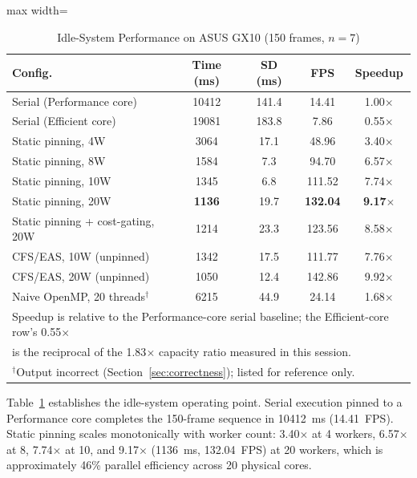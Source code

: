 \documentclass[conference]{IEEEtran}
\begin{document}
\begin{table}[htbp]
\caption{Idle-System Performance on ASUS GX10 (150 frames, $n=7$)}
\begin{center}
\small
\begin{adjustbox}{max width=\columnwidth}
\begin{tabular}{|l|c|c|c|c|}
\hline
\textbf{Config.} & \textbf{Time (ms)} & \textbf{SD (ms)} & \textbf{FPS} & \textbf{Speedup} \\
\hline
Serial (Performance core) & 10412 & 141.4 & 14.41 & 1.00$\times$ \\
Serial (Efficient core) & 19081 & 183.8 & 7.86 & 0.55$\times$ \\
\hline
Static pinning, 4W & 3064 & 17.1 & 48.96 & 3.40$\times$ \\
Static pinning, 8W & 1584 & 7.3 & 94.70 & 6.57$\times$ \\
Static pinning, 10W & 1345 & 6.8 & 111.52 & 7.74$\times$ \\
Static pinning, 20W & \textbf{1136} & 19.7 & \textbf{132.04} & \textbf{9.17$\times$} \\
Static pinning + cost-gating, 20W & 1214 & 23.3 & 123.56 & 8.58$\times$ \\
\hline
CFS/EAS, 10W (unpinned) & 1342 & 17.5 & 111.77 & 7.76$\times$ \\
CFS/EAS, 20W (unpinned) & 1050 & 12.4 & 142.86 & 9.92$\times$ \\
\hline
Naive OpenMP, 20 threads$^\dagger$ & 6215 & 44.9 & 24.14 & 1.68$\times$ \\
\hline
\multicolumn{5}{l}{\footnotesize Speedup is relative to the Performance-core serial baseline; the Efficient-core row's 0.55$\times$}\\
\multicolumn{5}{l}{\footnotesize is the reciprocal of the 1.83$\times$ capacity ratio measured in this session.}\\
\multicolumn{5}{l}{\footnotesize $^\dagger$Output incorrect (Section~\ref{sec:correctness}); listed for reference only.}\\
\end{tabular}
\end{adjustbox}
\label{tab:idle}
\end{center}
\end{table}

Table~\ref{tab:idle} establishes the idle-system operating point. Serial execution pinned to a Performance core completes the 150-frame sequence in 10412~ms (14.41~FPS). Static pinning scales monotonically with worker count: 3.40$\times$ at 4 workers, 6.57$\times$ at 8, 7.74$\times$ at 10, and 9.17$\times$ (1136~ms, 132.04~FPS) at 20 workers, which is approximately 46\% parallel efficiency across 20 physical cores.
\end{document}
